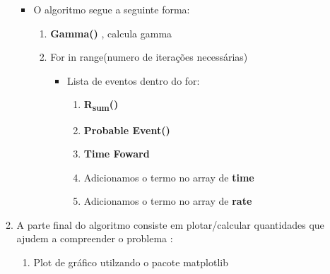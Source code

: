 \documentclass[11pt]{article}
\begin{document}
\begin{itemize}
\begin{enumerate}
\begin{itemize}
\item O algoritmo segue a seguinte forma:
\begin{enumerate}
\item \textbf{Gamma()} , calcula gamma
\item For in range(numero de iterações necessárias)
\begin{itemize}
\item Lista de eventos dentro do for:
\begin{enumerate}
\item \textbf{R\textsubscript{sum}()}
\item \textbf{Probable Event()}
\item \textbf{Time Foward}
\item Adicionamos o termo no array de \textbf{time}
\item Adicionamos o termo no array de \textbf{rate}
\end{enumerate}
\end{itemize}
\end{enumerate}
\end{itemize}
\item A parte final do algoritmo consiste em plotar/calcular quantidades que ajudem a compreender o problema :
\begin{enumerate}
\item Plot de gráfico utilzando o pacote matplotlib
\end{enumerate}
\end{enumerate}
\end{itemize}
\end{document}

